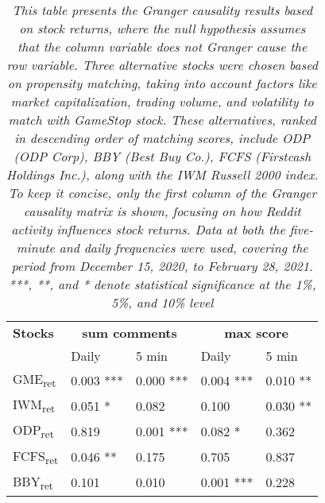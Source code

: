 \begin{table}[H]
\centering
\begin{tabular}{lllll}
\toprule
\textbf{Stocks} & \multicolumn{2}{c}{\textbf{sum comments}} & \multicolumn{2}{c}{\textbf{max score}} \\
\cmidrule(r){2-3} \cmidrule(r){4-5}
 & Daily & 5 min & Daily & 5 min \\
\midrule
GME\textsubscript{ret} & 0.003 *** & 0.000 *** & 0.004 *** & 0.010 ** \\
IWM\textsubscript{ret} & 0.051 * & 0.082 & 0.100 & 0.030 **  \\
ODP\textsubscript{ret} & 0.819  & 0.001 *** & 0.082 * & 0.362  \\
FCFS\textsubscript{ret} & 0.046 ** & 0.175 & 0.705  & 0.837 \\
BBY\textsubscript{ret} & 0.101 & 0.010 & 0.001 ***  & 0.228 \\

\bottomrule
\end{tabular}

\caption{\textit{This table presents the Granger causality results based on stock returns, where the null hypothesis assumes that the column variable does not Granger cause the row variable. Three alternative stocks were chosen based on propensity matching, taking into account factors like market capitalization, trading volume, and volatility to match with GameStop stock. These alternatives, ranked in descending order of matching scores, include ODP (ODP Corp), BBY (Best Buy Co.), FCFS (Firstcash Holdings Inc.), along with the IWM Russell 2000 index. To keep it concise, only the first column of the Granger causality matrix is shown, focusing on how Reddit activity influences stock returns. Data at both the five-minute and daily frequencies were used, covering the period from December 15, 2020, to February 28, 2021. ***, **, and * denote statistical significance at the 1\%, 5\%, and 10\% level}}
\label{tab:placebo}
\end{table}
